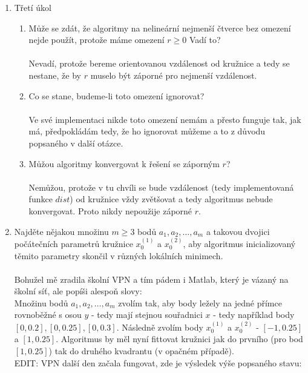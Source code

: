 \documentclass[12pt]{article}
\begin{document}
\begin{enumerate}
	\item Třetí úkol
	\begin{enumerate}[label=\arabic*)]
		\item 
		Může se zdát, že algoritmy na nelineární nejmenší čtverce bez omezení 
		nejde použít, protože máme omezení $r\ge0$ Vadí to? 
		\\ \\
		Nevadí, protože bereme orientovanou vzdálenost od kružnice a tedy se 
		nestane, že by $r$ muselo být záporné pro nejmenší vzdálenost.
		\item
		Co se stane, budeme-li toto omezení ignorovat? 
		\\ \\
		Ve své implementaci nikde toto omezení nemám a přesto funguje tak, jak má, 
		předpokládám tedy, že ho ignorovat můžeme a to z důvodu popsaného v další
		otázce.
		\item 
		Můžou algoritmy konvergovat k řešení se záporným $r$? 
		\\ \\
		Nemůžou, protože v tu chvíli se bude vzdálenost (tedy implementovaná
		funkce $dist$) od kružnice vždy zvětšovat a tedy algoritmus nebude 
		konvergovat. Proto nikdy nepoužije záporné $r$.
	\end{enumerate}
	\item Najděte nějakou množinu $m\ge3$ bodů $a_1, a_2, \ldots, a_m$ a takovou
	 dvojici počátečních parametrů kružnice $x^{(1)}_0$ a $x^{(2)}_0$, aby 
	 algoritmus inicializovaný těmito parametry skončil v různých lokálních 
	 minimech. 
	 \\ \\
	 Bohužel mě zradila školní VPN a tím pádem i Matlab, který je vázaný na 
	 školní síť, ale popíši alespoň slovy:
	 \\
	 Množinu bodů $a_1, a_2, \ldots, a_m$ zvolím tak, aby body ležely na jedné 
	 přímce rovnoběžné s osou $y$ - tedy mají stejnou souřadnici $x$ - tedy 
	 například body $[0, 0.2], [0, 0.25], [0, 0.3]$. Následně zvolím body 
	 $x^{(1)}_0$ a $x^{(2)}_0$ - $[-1, 0.25]$ a $[1, 0.25]$. Algoritmus by měl nyní 
	 fittovat kružnici jak do prvního (pro bod $[1, 0.25]$) tak do druhého 
	 kvadrantu (v opačném případě).
	 \\
	 EDIT: VPN další den začala fungovat, zde je výsledek výše popsaného stavu:
	\begin{center}
		\begin{tabular}{|c|c|c|}
			\hline

\end{tabular}
\end{center}
\end{enumerate}
\end{document}
